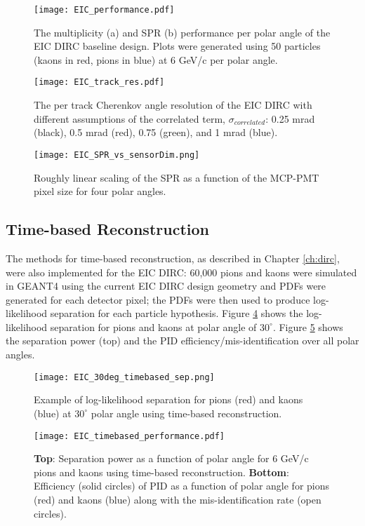 \begin{figure}[!htb]
	\centering
	\texttt{[image: EIC\_performance.pdf]}
	\caption{The multiplicity (a) and SPR (b) performance per polar angle of the EIC DIRC baseline design. Plots were generated using 50 particles (kaons in red, pions in blue) at 6 GeV/c per polar angle.}
	\label{fig:EIC_performance}
\end{figure}

\begin{figure}[!htb]
	\centering
	\texttt{[image: EIC\_track\_res.pdf]}
	\caption{The per track Cherenkov angle resolution of the EIC DIRC with different assumptions of the correlated term, $\sigma_{correlated}$: 0.25 mrad (black), 0.5 mrad (red), 0.75 (green), and 1 mrad (blue).}
	\label{fig:EIC_track_res}
\end{figure}

\begin{figure}[!htb]
	\centering
	\texttt{[image: EIC\_SPR\_vs\_sensorDim.png]}
	\caption{Roughly linear scaling of the SPR as a function of the MCP-PMT pixel size for four polar angles.}
	\label{fig:EIC_sensor_scaling}
\end{figure}

\subsection{Time-based Reconstruction}
The methods for time-based reconstruction, as described in Chapter \ref{ch:dirc}, were also implemented for the EIC DIRC: 60,000 pions and kaons were simulated in GEANT4 using the current EIC DIRC design geometry and PDFs were generated for each detector pixel; the PDFs were then used to produce log-likelihood separation for each particle hypothesis. Figure \ref{fig:EIC_timebased_ex} shows the log-likelihood separation for pions and kaons at polar angle of $30^\circ$.  Figure \ref{fig:EIC_timebased_performance} shows the separation power (top) and the PID efficiency/mis-identification over all polar angles.

\begin{figure}[!htb]
	\centering
	\texttt{[image: EIC\_30deg\_timebased\_sep.png]}
	\caption{Example of log-likelihood separation for pions (red) and kaons (blue) at $30^\circ$ polar angle using time-based reconstruction.}
	\label{fig:EIC_timebased_ex}
\end{figure}

\begin{figure}[!htb]
	\centering
	\texttt{[image: EIC\_timebased\_performance.pdf]}
	\caption{\textbf{Top}: Separation power as a function of polar angle for 6 GeV/c pions and kaons using time-based reconstruction. \textbf{Bottom}: Efficiency (solid circles) of PID as a function of polar angle for pions (red) and kaons (blue) along with the mis-identification rate (open circles).}
	\label{fig:EIC_timebased_performance}
\end{figure}

